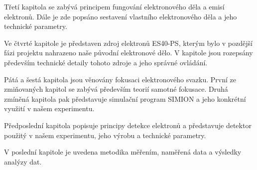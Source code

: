 Třetí kapitola se zabývá principem fungování elektronového děla a emisí elektronů. Dále je zde popsáno sestavení vlastního elektronového děla a jeho technické parametry.

Ve čtvrté kapitole je představen zdroj elektronů ES40-PS, kterým bylo v pozdější fázi projektu nahrazeno naše původní elektronové dělo. V kapitole jsou rozepsány především technické detaily tohoto zdroje a jeho správné ovládání.

Pátá a šestá kapitola jsou věnovány fokusaci elektronového svazku. První ze zmiňovaných kapitol se zabývá především teorií samotné fokusace. Druhá zmíněná kapitola pak představuje simulační program SIMION a jeho konkrétní využití v našem experimentu.

Předposlední kapitola popisuje principy detekce elektronů a představuje detektor použitý v našem experimentu, jeho výrobu a technické parametry.

V poslední kapitole je uvedena metodika měřením, naměřená data a výsledky analýzy dat.

